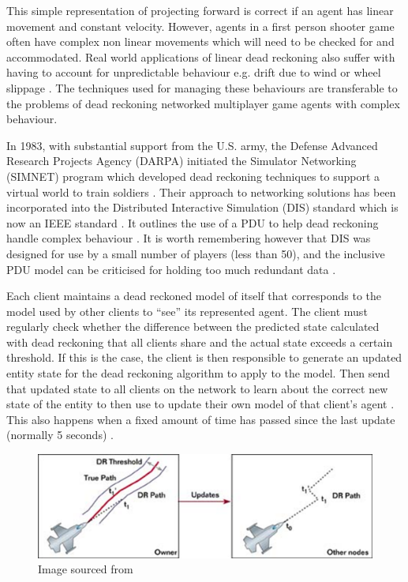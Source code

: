 \documentclass[journal]{IEEEtran}
\begin{document}
This simple representation of projecting forward is correct if an agent has linear movement and constant velocity. However, agents in a first person shooter game often have complex non linear movements which will need to be checked for and accommodated. Real world applications of linear dead reckoning also suffer with having to account for unpredictable behaviour e.g. drift due to wind or wheel slippage \cite{chung2001accurate} \cite{ojeda2004experimental}. The techniques used for managing these behaviours are transferable to the problems of dead reckoning networked multiplayer game agents with complex behaviour.

In 1983, with substantial support from the U.S. army, the Defense Advanced Research Projects Agency (DARPA) initiated the Simulator Networking (SIMNET) program which developed dead reckoning techniques to support a virtual world to train soldiers \cite{calvin1993simnet}. Their approach to networking solutions has been incorporated into the Distributed Interactive Simulation (DIS) standard which is now an IEEE standard \cite{dis1998ieee}. It outlines the use of a PDU to help dead reckoning handle complex behaviour \cite{mccarty1994virtual}. It is worth remembering however that DIS was designed for use by a small number of players (less than 50), and the inclusive PDU model can be criticised for holding too much redundant data \cite{henderson2001latency}.
 
Each client maintains a dead reckoned model of itself that corresponds to the model used by other clients to ``see'' its represented agent. The client must regularly check whether the difference between the predicted state calculated with dead reckoning that all clients share and the actual state exceeds a certain threshold. If this is the case, the client is then responsible to generate an updated entity state for the dead reckoning algorithm to apply to the model. Then send that updated state to all clients on the network to learn about the correct new state of the entity to then use to update their own model of that client's agent \cite{calvin1993simnet} \cite{mauve2000keep}. This also happens when a fixed amount of time has passed since the last update (normally 5 seconds) \cite{mills1992network}.

\begin{figure}[h]
    \centering
    \includegraphics[width=0.8\linewidth]{Threshold1.png}
    \caption{Image sourced from \cite{aronson1997gamasutra}}
    \label{fig:threshold}
\end{figure}
\end{document}
